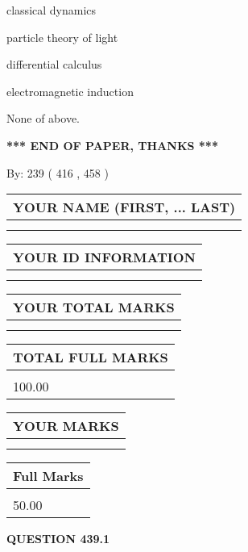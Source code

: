 \documentclass[12pt]{article}
\begin{document}
 
classical dynamics
 
 
particle theory of light
 
 
differential calculus
 
 
electromagnetic induction
 
 
 None of above.
 
 
   
   
\vspace{1.0in} 
{\textbf{\large{ *** END OF PAPER, THANKS *** }}} 
   
   
\hspace{1.0in} By: 
 239 ( 416 ,  458 )
   
   
   
   
\newpage 
\setcounter{page}{ 
   439001 } 
   
   
   
   
\noindent\begin{tabular}{|l|}
\hline
YOUR NAME (FIRST, ... LAST)  \\
\hline
 \\ 
 \\ 
\hline
\end{tabular}
\hspace{0.05in} \begin{tabular}{|l|}
\hline
 YOUR   ID   INFORMATION  \\
\hline
 \\ 
 \\ 
\hline
\end{tabular}
   
   
\vspace{0.2in}\noindent\begin{tabular}{|l|}
\hline
YOUR TOTAL MARKS  \\
\hline
 \\ 
 \\ 
\hline
\end{tabular}
\hspace{0.05in} \begin{tabular}{|l|}
\hline
TOTAL FULL MARKS  \\
\hline
 \\ 
100.00 \\
\hline
\end{tabular}
  
\vspace{0.2in}
  
\noindent\begin{tabular}{|l|}
\hline
 YOUR MARKS  \\
\hline
 \\ 
 \\ 
\hline
\end{tabular}
\hspace{0.05in} \begin{tabular}{|l|}
\hline
 Full Marks  \\
\hline
 \\ 
50.00 \\
\hline
\end{tabular}
{\textbf{\Large{QUESTION
439.1 
}}}
  
\end{document}
